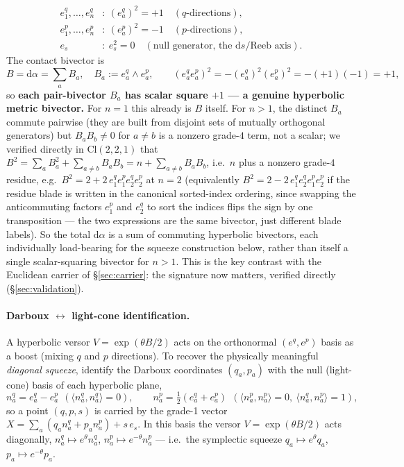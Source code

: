 \documentclass[11pt]{article}
\newcommand{\Cl}{\mathrm{Cl}}
\newcommand{\dif}{\mathrm{d}}
\begin{document}
\begin{align*}
e^q_1,\dots,e^q_n&:\ (e^q_a)^2=+1 \quad(q\text{-directions}), \\
e^p_1,\dots,e^p_n&:\ (e^p_a)^2=-1 \quad(p\text{-directions}), \\
e_s&:\ e_s^2=0 \quad(\text{null generator, the }\dif s/\text{Reeb axis}).
\end{align*}
The contact bivector is
\begin{equation}
B = \dif\alpha = \sum_a B_a, \quad B_a := e^q_a\wedge e^p_a, \qquad (e^q_a e^p_a)^2 = -(e^q_a)^2(e^p_a)^2 = -(+1)(-1) = +1,
\label{eq:pairbivector}
\end{equation}
so \textbf{each pair-bivector $B_a$ has scalar square $+1$ — a genuine hyperbolic metric bivector.} For $n=1$ this already is $B$ itself. For $n>1$, the distinct $B_a$ commute pairwise (they are built from disjoint sets of mutually orthogonal generators) but $B_a B_b\ne0$ for $a\ne b$ is a nonzero grade-$4$ term, not a scalar; we verified directly in $\Cl(2,2,1)$ that $B^2 = \sum_a B_a^2 + \sum_{a\ne b}B_aB_b = n + \sum_{a\ne b}B_aB_b$, i.e.\ $n$ plus a nonzero grade-$4$ residue, e.g.\ $B^2=2+2\,e^q_1e^p_1e^q_2e^p_2$ at $n=2$ (equivalently $B^2=2-2\,e^q_1e^q_2e^p_1e^p_2$ if the residue blade is written in the canonical sorted-index ordering, since swapping the anticommuting factors $e^p_1$ and $e^q_2$ to sort the indices flips the sign by one transposition — the two expressions are the same bivector, just different blade labels). So the total $\dif\alpha$ is a sum of commuting hyperbolic bivectors, each individually load-bearing for the squeeze construction below, rather than itself a single scalar-squaring bivector for $n>1$. This is the key contrast with the Euclidean carrier of \S\ref{sec:carrier}: the signature now matters, verified directly (\S\ref{sec:validation}).

\paragraph{Darboux $\leftrightarrow$ light-cone identification.} A hyperbolic versor $V=\exp(\theta B/2)$ acts on the orthonormal $(e^q,e^p)$ basis as a boost (mixing $q$ and $p$ directions). To recover the physically meaningful \emph{diagonal squeeze}, identify the Darboux coordinates $(q_a,p_a)$ with the null (light-cone) basis of each hyperbolic plane,
\begin{equation}
n^q_a = e^q_a - e^p_a \ \ (\langle n^q_a,n^q_a\rangle=0), \qquad
n^p_a = \tfrac12(e^q_a+e^p_a) \ \ (\langle n^p_a,n^p_a\rangle=0,\ \langle n^q_a,n^p_a\rangle=1),
\end{equation}
so a point $(q,p,s)$ is carried by the grade-1 vector $X=\sum_a(q_a n^q_a + p_a n^p_a) + s\,e_s$. In this basis the versor $V=\exp(\theta B/2)$ acts diagonally, $n^q_a\mapsto e^{\theta}n^q_a$, $n^p_a\mapsto e^{-\theta}n^p_a$ — i.e.\ the symplectic squeeze $q_a\mapsto e^{\theta}q_a$, $p_a\mapsto e^{-\theta}p_a$.
\end{document}
